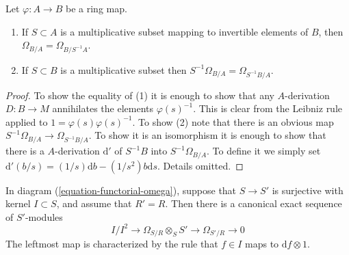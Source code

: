\begin{lemma}
\label{lemma-differentials-localize}
Let $\varphi : A \to B$ be a ring map.
\begin{enumerate}
\item If $S \subset A$ is a multiplicative subset mapping to
invertible elements of $B$, then $\Omega_{B/A} = \Omega_{B/S^{-1}A}$.
\item If $S \subset B$ is a multiplicative subset then
$S^{-1}\Omega_{B/A} = \Omega_{S^{-1}B/A}$.
\end{enumerate}
\end{lemma}

\begin{proof}
To show the equality of (1) it is enough to show that any
$A$-derivation $D : B \to M$ annihilates the elements $\varphi(s)^{-1}$.
This is clear from the Leibniz rule applied to
$1 = \varphi(s) \varphi(s)^{-1}$.
To show (2) note that there is an obvious map
$S^{-1}\Omega_{B/A} \to \Omega_{S^{-1}B/A}$.
To show it is an isomorphism it is enough to show that
there is a $A$-derivation $\text{d}'$ of $S^{-1}B$ into $S^{-1}\Omega_{B/A}$.
To define it we simply set
$\text{d}'(b/s) = (1/s)\text{d}b - (1/s^2)b\text{d}s$.
Details omitted.
\end{proof}

\begin{lemma}
\label{lemma-differential-seq}
In diagram (\ref{equation-functorial-omega}),
suppose that $S \to S'$ is surjective with kernel $I \subset S$,
and assume that $R' = R$.
Then there is a canonical exact sequence of $S'$-modules
$$
I/I^2
\longrightarrow
\Omega_{S/R} \otimes_S S'
\longrightarrow
\Omega_{S'/R}
\longrightarrow
0
$$
The leftmost map is characterized by the rule that
$f \in I$ maps to $\text{d}f \otimes 1$.
\end{lemma}

